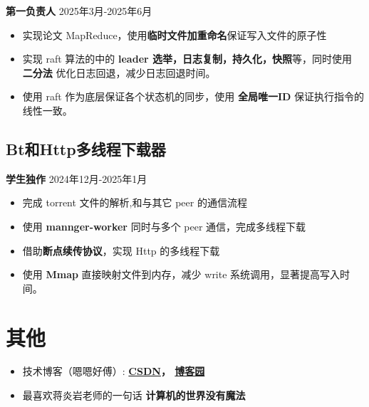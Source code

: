 \documentclass[11pt]{article}
\begin{document}
    \textbf{第一负责人} \hfill 2025年3月-2025年6月
    \begin{itemize}
        \item 实现论文 MapReduce，使用\textbf{临时文件加重命名}保证写入文件的原子性
        \item 实现 raft 算法的中的 \textbf{leader 选举，日志复制，持久化，快照}等，同时使用 \textbf{二分法} 优化日志回退，减少日志回退时间。
        \item 使用 raft 作为底层保证各个状态机的同步，使用 \textbf{全局唯一ID} 保证执行指令的线性一致。
    \end{itemize}
    
    \vspace{1em}                %
    \subsection{Bt和Http多线程下载器 \hfill }

    \textbf{学生独作} \hfill 2024年12月-2025年1月
    \begin{itemize}
        \item 完成 torrent 文件的解析,和与其它 peer 的通信流程
        \item 使用 \textbf{mannger-worker} 同时与多个 peer 通信，完成多线程下载
        \item 借助\textbf{断点续传协议}，实现 Http 的多线程下载
        \item 使用 \textbf{Mmap} 直接映射文件到内存，减少 write 系统调用，显著提高写入时间。
    \end{itemize}

    \section{\makebox[\widthof{\faInfo}][c]{\color{NPU_Blue}{\faInfo}}\quad 其他}
    \begin{itemize}
        \item 技术博客（嗯嗯好傅）: \textbf{\href{https://blog.csdn.net/2301_81836829?spm=1010.2135.3001.5421}{CSDN}， \href{https://www.cnblogs.com/eehaofu}{博客园}}
        \item 最喜欢蒋炎岩老师的一句话 \textbf{计算机的世界没有魔法}
    \end{itemize}
\end{document}
